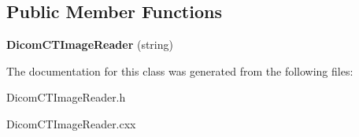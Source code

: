 \subsection*{Public Member Functions}
\begin{DoxyCompactItemize}
\item 
\hypertarget{class_dicom_c_t_image_reader_a171bf16e8db2e225890b698b8984ca1c}{
{\bfseries DicomCTImageReader} (string)}
\label{class_dicom_c_t_image_reader_a171bf16e8db2e225890b698b8984ca1c}

\end{DoxyCompactItemize}


The documentation for this class was generated from the following files:\begin{DoxyCompactItemize}
\item 
DicomCTImageReader.h\item 
DicomCTImageReader.cxx\end{DoxyCompactItemize}
